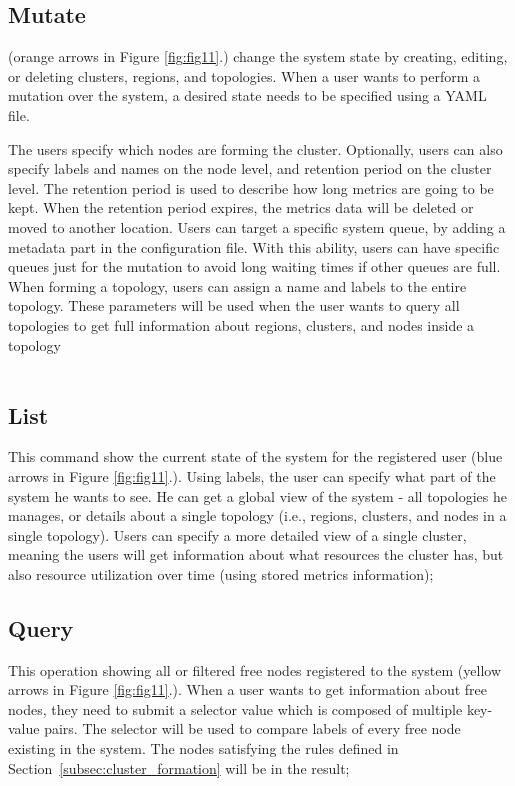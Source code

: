 \subsection{Mutate}\label{sec:mutate} 
(orange arrows in Figure \ref{fig:fig11}.) change the system state by creating, editing, or deleting clusters, regions, and topologies. When a user wants to perform a mutation over the system, a desired state needs to be specified using a YAML file. 

The users specify which nodes are forming the cluster. Optionally, users can also specify labels and names on the node level, and retention period on the cluster level. The retention period is used to describe how long metrics are going to be kept. When the retention period expires, the metrics data will be deleted or moved to another location. Users can target a specific system queue, by adding a metadata part in the configuration file. With this ability, users can have specific queues just for the mutation to avoid long waiting times if other queues are full. When forming a topology, users can assign a name and labels to the entire topology. These parameters will be used when the user wants to query all topologies to get full information about regions, clusters, and nodes inside a topology

\begin{center}
	\begin{tabular}{c}
		
	\end{tabular}
\end{center}
%
%
\subsection{List}\label{sec:list}  
This command show the current state of the system for the registered user (blue arrows in Figure \ref{fig:fig11}.). Using labels, the user can specify what part of the system he wants to see. He can get a global view of the system - all topologies he manages, or details about a single topology (i.e., regions, clusters, and nodes in a single topology). Users can specify a more detailed view of a single cluster, meaning the users will get information about what resources the cluster has, but also resource utilization over time (using stored metrics information); 
%
%
\subsection{Query}\label{sec:query}  
This operation showing all or filtered free nodes registered to the system (yellow arrows in Figure \ref{fig:fig11}.). When a user wants to get information about free nodes, they need to submit a selector value which is composed of multiple key-value pairs. The selector will be used to compare labels of every free node existing in the system. The nodes satisfying the rules defined in Section~\ref{subsec:cluster_formation} will be in the result; 
%
%
